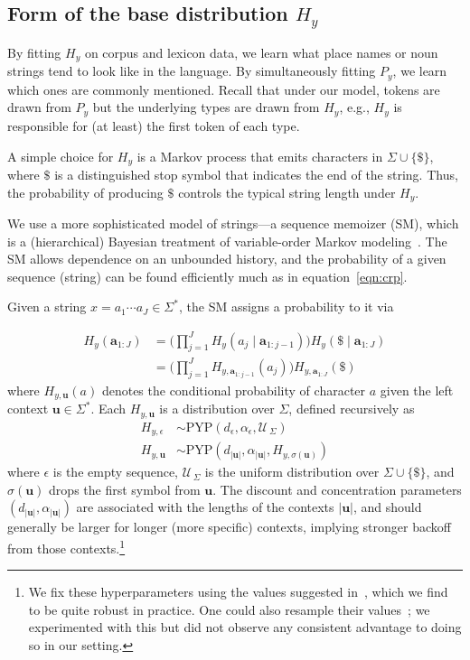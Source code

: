 \documentclass[11pt]{article}
\newcommand{\EOS}{\$}
\begin{document}
\subsection{Form of the base distribution $H_y$}\label{sec:basedist}

By fitting $H_y$ on corpus and lexicon data, we learn what place names or noun strings tend to look like in the language.  By simultaneously fitting $P_y$, we learn which ones are commonly mentioned.  Recall that under our model, tokens are drawn from $P_y$ but the underlying types are drawn from $H_y$, e.g., $H_y$ is responsible for (at least) the first token of each type.

A simple choice for $H_y$ is a Markov process
that emits characters in $\Sigma \cup \{\EOS\}$, where $\EOS$
is a distinguished stop symbol that indicates the end of the string.
Thus, the probability of producing $\EOS$ controls the typical string
length under $H_y$.

We use a more sophisticated model of strings---a sequence memoizer (SM), which is a (hierarchical) Bayesian treatment of variable-order Markov modeling~\cite{wood2009}.  The SM allows dependence on an unbounded history, and the probability of a given sequence (string) can be found efficiently much as in equation~\eqref{eqn:crp}.

Given a string $x = a_1 \cdots a_J \in \Sigma^*$, the SM assigns a
probability to it via

\noindent
\begin{align}
\!\!H_y(\bm{a}_{1:J}) &= \Big( \prod_{j=1}^J H_y(a_j \mid \bm{a}_{1:j-1}) \Big) H_y(\EOS \mid \bm{a}_{1:J}) \nonumber \\
& = \Big( \prod_{j=1}^J H_{y,{\bm{a}_{1:j-1}}}(a_j) \Big) H_{y,{\bm{a}_{1:J}}}(\EOS)
\end{align}
where $H_{y,{\bm{u}}}(a)$ denotes the conditional probability of character
$a$ given the left context $\bm{u} \in
\Sigma^{*}$. Each $H_{y,{\mathbf{u}}}$ is a distribution over
$\Sigma$, defined recursively as
\begin{align}\label{eqn:H}
H_{y,\epsilon} & \sim \mathrm{PYP}(d_\epsilon, \alpha_\epsilon, \mathcal{U}_{\,\Sigma}) \\
H_{y,\bm{u}} & \sim \mathrm{PYP}(d_{|\mathbf{u}|}, \alpha_{|\mathbf{u}|}, H_{y,\sigma(\mathbf{u})}) \nonumber
\end{align}
where $\epsilon$ is the empty sequence, $\mathcal{U}_{\,\Sigma}$ is
the uniform distribution over $\Sigma \cup \{\EOS\}$, and $\sigma(\mathbf{u})$ drops the first symbol from
$\mathbf{u}$. The discount and concentration parameters
$(d_{|\mathbf{u}|}, \alpha_{|\mathbf{u}|})$ are associated with the
lengths of the contexts $|\bm{u}|$, and should generally be
larger for longer (more specific) contexts, implying stronger backoff
from those contexts.\footnote{We fix these hyperparameters using the values
  suggested in~\cite{wood2009,gasthaus2010}, which we find to be quite
  robust in practice. One could also resample their
  values~\cite{blunsom2011hierarchical}; we experimented with this but did not observe any consistent advantage to
  doing so in our setting.}
\end{document}
